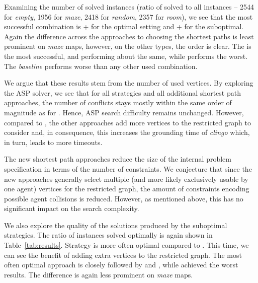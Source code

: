 Examining the number of solved instances (ratio of solved to all instances -- 2544 for \emph{empty}, 1956 for \emph{maze}, 2418 for \emph{random}, 2357 for \emph{room}), we see that the most successful combination is \ssp{} + \pss{} for the optimal setting and \ssc{} + \pss{} for the suboptimal. Again the difference across the approaches to choosing the shortest paths is least prominent on \emph{maze} maps, however, on the other types, the order is clear. The \pss{} is the most successful, \psd{} and \psr{} performing about the same, while \psa{} performs the worst. The \emph{baseline} \ssb{} performs worse than any other used combination.

We argue that these results stem from the number of used vertices. By exploring the ASP solver, we see that for all strategies and all additional shortest path approaches, the number of conflicts stays mostly within the same order of magnitude as for \pss{}. Hence, ASP search difficulty remains unchanged.
However, compared to \pss{}, the other approaches add more vertices to the restricted graph to consider and, in consequence, this increases the grounding time of \emph{clingo} which, in turn, leads to more timeouts.

The new shortest path approaches reduce the size of the internal problem specification in terms of the number of constraints.
We conjecture that since the new approaches generally select multiple (and more likely exclusively usable by one agent) vertices for the restricted graph, the amount of constraints encoding possible agent collisions is reduced. However, as mentioned above, this has no significant impact on the search complexity.

We also explore the quality of the solutions produced by the suboptimal strategies. The ratio of instances solved optimally is again shown in Table~\ref{tab:results}. Strategy \ssc{} is more often optimal compared to \ssm{}. This time, we can see the benefit of adding extra vertices to the restricted graph. The most often optimal approach is \psa{} closely followed by \psr{} and \psd{}, while \pss{} achieved the worst results. The difference is again less prominent on \emph{maze} maps.


